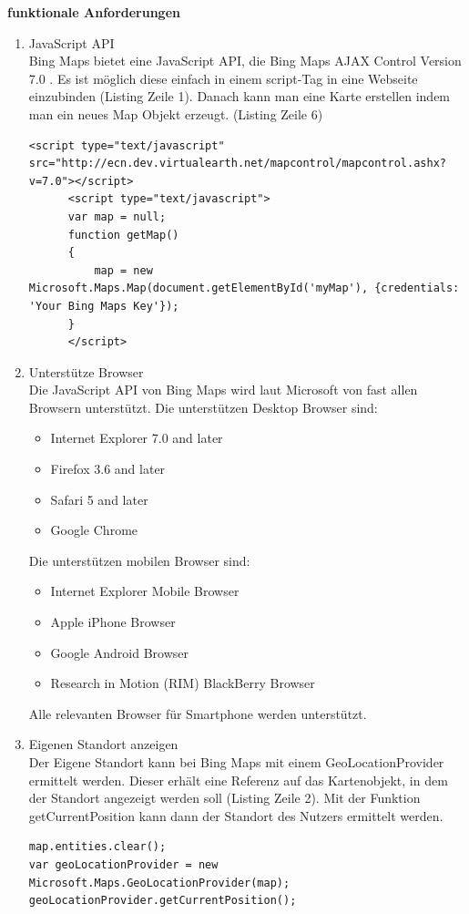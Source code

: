 \textbf{funktionale Anforderungen}
\begin{enumerate}
\item JavaScript API\\
Bing Maps bietet eine JavaScript API, die \glqq Bing Maps AJAX Control Version 7.0 \grqq. Es ist möglich diese einfach in einem script-Tag in eine Webseite einzubinden (Listing Zeile 1). Danach kann man eine Karte erstellen indem man ein neues Map Objekt erzeugt. (Listing Zeile 6) 
\begin{lstlisting}
<script type="text/javascript" src="http://ecn.dev.virtualearth.net/mapcontrol/mapcontrol.ashx?v=7.0"></script>
      <script type="text/javascript">
      var map = null;
      function getMap()
      {
          map = new Microsoft.Maps.Map(document.getElementById('myMap'), {credentials: 'Your Bing Maps Key'});
      }   
      </script>
\end{lstlisting} \cite[Codebeispiel CreateMap1]{bingmaps}


\item Unterstütze Browser\\
Die JavaScript API von Bing Maps wird laut Microsoft von fast allen Browsern unterstützt. 
Die unterstützen Desktop Browser sind:
\glqq
\begin{itemize}
\item Internet Explorer 7.0 and later
\item Firefox 3.6 and later
\item Safari 5 and later
\item Google Chrome
\end{itemize}

Die unterstützen mobilen Browser sind:
\begin{itemize}
\item Internet Explorer Mobile Browser
\item Apple iPhone Browser
\item Google Android Browser
\item Research in Motion (RIM) BlackBerry Browser
\end{itemize}
\grqq \cite{microsoftbrowser}

Alle relevanten Browser für Smartphone werden unterstützt.

\item Eigenen Standort anzeigen\\
Der Eigene Standort kann bei Bing Maps mit einem \glqq GeoLocationProvider \grqq ermittelt werden. Dieser erhält eine Referenz auf das Kartenobjekt, in dem der Standort angezeigt werden soll (Listing Zeile 2). Mit der Funktion \glqq getCurrentPosition \grqq kann dann der Standort des Nutzers ermittelt werden.
\begin{lstlisting}
map.entities.clear(); 
var geoLocationProvider = new Microsoft.Maps.GeoLocationProvider(map);  
geoLocationProvider.getCurrentPosition(); 
\end{lstlisting}\cite[Codebeispiel GetUserLocation1]{bingmaps}


\end{enumerate}
